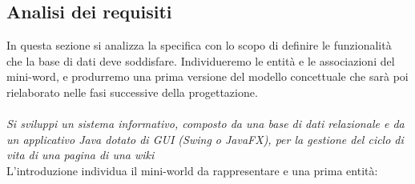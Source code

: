 \documentclass{article}
\begin{document}
	\subsection{Analisi dei requisiti}
		In questa sezione si analizza la specifica con lo scopo di definire le funzionalità
	che la base di dati deve soddisfare. Individueremo le entità e le associazioni
	del mini-word, e produrremo una prima versione del modello concettuale che
	sarà poi rielaborato nelle fasi successive della progettazione.\\ \\
	{\itshape Si sviluppi un sistema informativo, composto da una base di dati relazionale e da un applicativo Java dotato
		di GUI (Swing o JavaFX), per la gestione del ciclo di vita di una pagina di una wiki}
	\vspace{0.5cm}
	\\
	L'introduzione individua il mini-world da rappresentare e una prima entità:
\end{document}
